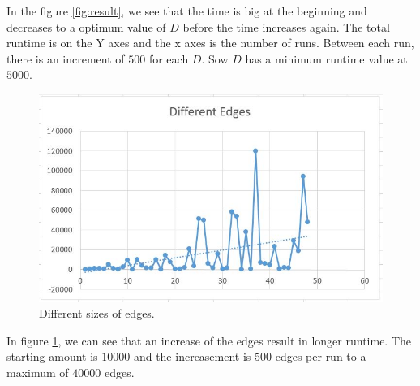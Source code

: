 \documentclass[paper=a4, fontsize=11pt]{scrartcl}
\numberwithin{equation}{section}		%
\numberwithin{figure}{section}			%
\numberwithin{table}{section}				%
\begin{document}
In the figure \ref{fig:result}, we see that the time is big at the beginning and decreases to a optimum value of $D$ before the time increases again. The total runtime is on the Y axes and the x axes is the number of runs. Between each run, there is an increment of $500$ for each $D$. Sow $D$ has a minimum runtime value at $5000$. 

\begin{figure}[h!]
  \includegraphics[width=\linewidth]{edge.jpg}
  \caption{Different sizes of edges.}
  \label{fig:result2}
\end{figure}

In figure \ref{fig:result2}, we can see that an increase of the edges result in longer runtime. The starting amount is $10000$ and the increasement is $500$ edges per run to a maximum of $40000$ edges.
\end{document}
